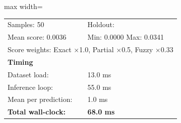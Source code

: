 \begin{table}[htbp]
\begin{adjustbox}{max width=\textwidth}
\begin{tabular}{r p{5cm} r r r r}
\midrule
\multicolumn{3}{l}{Samples: 50} & \multicolumn{3}{l}{Holdout: } \\
\multicolumn{3}{l}{Mean score: 0.0036} & \multicolumn{3}{l}{Min: 0.0000 \quad Max: 0.0341} \\
\multicolumn{6}{l}{Score weights: Exact $\times$1.0, Partial $\times$0.5, Fuzzy $\times$0.33} \\
\midrule
\multicolumn{6}{l}{\textbf{Timing}} \\
\midrule
\multicolumn{3}{l}{Dataset load:} & \multicolumn{3}{l}{13.0 ms} \\
\multicolumn{3}{l}{Inference loop:} & \multicolumn{3}{l}{55.0 ms} \\
\multicolumn{3}{l}{Mean per prediction:} & \multicolumn{3}{l}{1.0 ms} \\
\multicolumn{3}{l}{\textbf{Total wall-clock:}} & \multicolumn{3}{l}{\textbf{68.0 ms}} \\
\bottomrule
\end{tabular}
\end{adjustbox}
\end{table}
